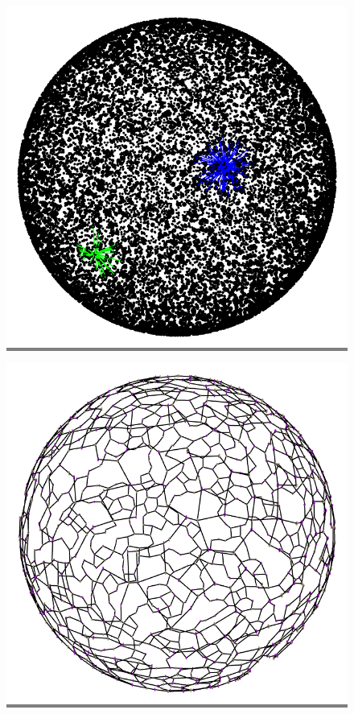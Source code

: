 \documentclass{article}
\begin{document}
\begin{figure}
    \begin{minipage}{0.3\textwidth}
    \colorbox{gray}{\includegraphics[width=\linewidth]{./images/sphere_0.png}}
    \end{minipage}
    \hspace{\fill}
    \begin{minipage}{0.3\textwidth}
    \colorbox{gray}{\includegraphics[width=\linewidth]{./images/sphere_0_bb_0.png}}

\end{minipage}
\end{figure}
\end{document}
